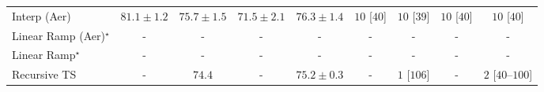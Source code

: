\begin{tabular}{l|cccc|cccc|}
Interp (Aer) & {\cellcolor[HTML]{862E05}} \color[HTML]{F1F1F1} $81.1\pm 1.2$ & {\cellcolor[HTML]{FEB23F}} \color[HTML]{000000} $75.7\pm 1.5$ & {\cellcolor[HTML]{FFFCD7}} \color[HTML]{000000} $71.5\pm 2.1$ & {\cellcolor[HTML]{FE9F2E}} \color[HTML]{000000} $76.3\pm 1.4$ & {\cellcolor[HTML]{FFF6F2}} \color[HTML]{000000} $10$ [$40$] & {\cellcolor[HTML]{FFF6F2}} \color[HTML]{000000} $10$ [$39$] & {\cellcolor[HTML]{FFF6F2}} \color[HTML]{000000} $10$ [$40$] & {\cellcolor[HTML]{FFF6F2}} \color[HTML]{000000} $10$ [$40$] \\
Linear Ramp (Aer)$^\star$ & {\cellcolor[HTML]{000000}} \color[HTML]{F1F1F1} {\cellcolor{white}} \color{black} - & {\cellcolor[HTML]{000000}} \color[HTML]{F1F1F1} {\cellcolor{white}} \color{black} - & {\cellcolor[HTML]{000000}} \color[HTML]{F1F1F1} {\cellcolor{white}} \color{black} - & {\cellcolor[HTML]{000000}} \color[HTML]{F1F1F1} {\cellcolor{white}} \color{black} - & {\cellcolor[HTML]{000000}} \color[HTML]{F1F1F1} {\cellcolor{white}} \color{black} - & {\cellcolor[HTML]{000000}} \color[HTML]{F1F1F1} {\cellcolor{white}} \color{black} - & {\cellcolor[HTML]{000000}} \color[HTML]{F1F1F1} {\cellcolor{white}} \color{black} - & {\cellcolor[HTML]{000000}} \color[HTML]{F1F1F1} {\cellcolor{white}} \color{black} - \\
Linear Ramp$^\star$ & {\cellcolor[HTML]{000000}} \color[HTML]{F1F1F1} {\cellcolor{white}} \color{black} - & {\cellcolor[HTML]{000000}} \color[HTML]{F1F1F1} {\cellcolor{white}} \color{black} - & {\cellcolor[HTML]{000000}} \color[HTML]{F1F1F1} {\cellcolor{white}} \color{black} - & {\cellcolor[HTML]{000000}} \color[HTML]{F1F1F1} {\cellcolor{white}} \color{black} - & {\cellcolor[HTML]{000000}} \color[HTML]{F1F1F1} {\cellcolor{white}} \color{black} - & {\cellcolor[HTML]{000000}} \color[HTML]{F1F1F1} {\cellcolor{white}} \color{black} - & {\cellcolor[HTML]{000000}} \color[HTML]{F1F1F1} {\cellcolor{white}} \color{black} - & {\cellcolor[HTML]{000000}} \color[HTML]{F1F1F1} {\cellcolor{white}} \color{black} - \\
Recursive TS & {\cellcolor[HTML]{000000}} \color[HTML]{F1F1F1} {\cellcolor{white}} \color{black} - & {\cellcolor[HTML]{FED471}} \color[HTML]{000000} $74.4$ & {\cellcolor[HTML]{000000}} \color[HTML]{F1F1F1} {\cellcolor{white}} \color{black} - & {\cellcolor[HTML]{FEC24D}} \color[HTML]{000000} $75.2\pm 0.3$ & {\cellcolor[HTML]{000000}} \color[HTML]{F1F1F1} {\cellcolor{white}} \color{black} - & {\cellcolor[HTML]{FFF7F3}} \color[HTML]{000000} $1$ [$106$] & {\cellcolor[HTML]{000000}} \color[HTML]{F1F1F1} {\cellcolor{white}} \color{black} - & {\cellcolor[HTML]{FFF7F3}} \color[HTML]{000000} $2$ [$40$--$100$] \\

\end{tabular}
